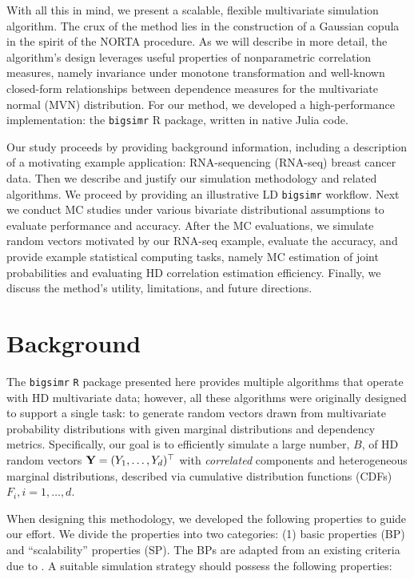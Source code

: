 \documentclass[
]{jss}
\begin{document}
With all this in mind, we present a scalable, flexible multivariate
simulation algorithm. The crux of the method lies in the construction of
a Gaussian copula in the spirit of the NORTA procedure. As we will
describe in more detail, the algorithm's design leverages useful
properties of nonparametric correlation measures, namely invariance
under monotone transformation and well-known closed-form relationships
between dependence measures for the multivariate normal (MVN)
distribution. For our method, we developed a high-performance
implementation: the \texttt{bigsimr} R package, written in native Julia
code.

Our study proceeds by providing background information, including a
description of a motivating example application: RNA-sequencing
(RNA-seq) breast cancer data. Then we describe and justify our
simulation methodology and related algorithms. We proceed by providing
an illustrative LD \texttt{bigsimr} workflow. Next we conduct MC studies
under various bivariate distributional assumptions to evaluate
performance and accuracy. After the MC evaluations, we simulate random
vectors motivated by our RNA-seq example, evaluate the accuracy, and
provide example statistical computing tasks, namely MC estimation of
joint probabilities and evaluating HD correlation estimation efficiency.
Finally, we discuss the method's utility, limitations, and future
directions.

\hypertarget{background}{%
\section{Background}\label{background}}

The \texttt{bigsimr} \texttt{R} package presented here provides multiple
algorithms that operate with HD multivariate data; however, all these
algorithms were originally designed to support a single task: to
generate random vectors drawn from multivariate probability
distributions with given marginal distributions and dependency metrics.
Specifically, our goal is to efficiently simulate a large number, \(B\),
of HD random vectors \({\bf Y}=(Y_1, \ldots, Y_d)^\top\) with
\emph{correlated} components and heterogeneous marginal distributions,
described via cumulative distribution functions (CDFs)
\(F_i, i=1,\ldots,d\).

When designing this methodology, we developed the following properties
to guide our effort. We divide the properties into two categories: (1)
basic properties (BP) and ``scalability'' properties (SP). The BPs are
adapted from an existing criteria due to \citet{Nik13a}. A suitable
simulation strategy should possess the following properties:
\end{document}
